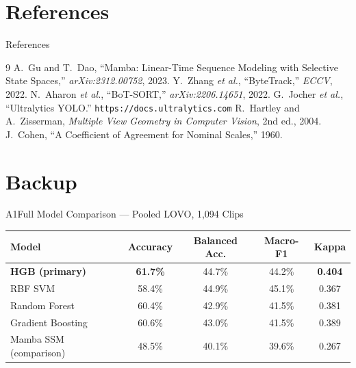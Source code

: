 \documentclass[aspectratio=169, 11pt]{beamer}
\begin{document}
\section{References}

\begin{frame}[allowframebreaks]{References}
    \footnotesize
    \begin{thebibliography}{9}
         A.~Gu and T.~Dao, ``Mamba: Linear-Time Sequence Modeling with Selective State Spaces,'' \emph{arXiv:2312.00752}, 2023.
         Y.~Zhang \emph{et al.}, ``ByteTrack,'' \emph{ECCV}, 2022.
         N.~Aharon \emph{et al.}, ``BoT-SORT,'' \emph{arXiv:2206.14651}, 2022.
         G.~Jocher \emph{et al.}, ``Ultralytics YOLO.'' \texttt{https://docs.ultralytics.com}
         R.~Hartley and A.~Zisserman, \emph{Multiple View Geometry in Computer Vision}, 2nd ed., 2004.
         J.~Cohen, ``A Coefficient of Agreement for Nominal Scales,'' 1960.
    \end{thebibliography}
\end{frame}

\begin{frame}
    \centering {\Huge \textbf{\textcolor{amritaMaroon}{Thank You}}}
\end{frame}

\appendix
\section{Backup}
\begin{frame}[t]{A1\quad Full Model Comparison --- Pooled LOVO, 1{,}094 Clips}
    \small
    \begin{center}
    \begin{tabular}{@{}lcccc@{}}
        \toprule
        Model & Accuracy & Balanced Acc. & Macro-F1 & Kappa \\
        \midrule
        \textbf{HGB (primary)}  & \textbf{61.7\%} & 44.7\% & 44.2\% & \textbf{0.404} \\
        RBF SVM                 & 58.4\% & 44.9\% & 45.1\% & 0.367 \\
        Random Forest           & 60.4\% & 42.9\% & 41.5\% & 0.381 \\
        Gradient Boosting       & 60.6\% & 43.0\% & 41.5\% & 0.389 \\
        Mamba SSM (comparison)  & 48.5\% & 40.1\% & 39.6\% & 0.267 \\
        \bottomrule
    \end{tabular}
    \end{center}
\end{frame}
\end{document}
